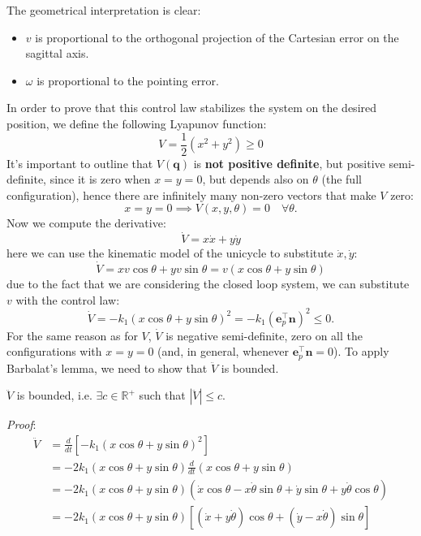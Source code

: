 \documentclass[10pt, a4paper]{report}
\newcommand{\q}{{\mathbf q}}
\begin{document}
\noindent The geometrical interpretation is clear:\begin{itemize}
    \item $v$ is proportional to the orthogonal projection of the Cartesian error on the sagittal axis.
    \item $\omega$ is proportional to the pointing error.
\end{itemize}
In order to prove that this control law stabilizes the system on the desired position, we define the following Lyapunov function:\begin{equation}
    V=\frac{1}{2}(x^2+y^2)\ge 0
\end{equation}
It's important to outline that $V(\q)$ is \textbf{not positive definite}, but positive semi-definite, since it is zero when $x=y=0$, but depends also on $\theta$ (the full configuration), hence there are infinitely many non-zero vectors that make $V$ zero:\begin{equation}
    x=y=0\implies V(x,y,\theta)=0 \quad \forall \theta.
\end{equation}
Now we compute the derivative:\begin{equation}
    \dot V = x\dot x+y\dot y 
\end{equation}
here we can use the kinematic model of the unicycle to substitute $\dot x,\dot y$:
\begin{equation}
    \dot V = xv\cos\theta+yv\sin\theta=v(x\cos\theta+y\sin\theta)
\end{equation}
due to the fact that we are considering the closed loop system, we can substitute $v$ with the control law:\begin{equation}
    \dot V = -k_1(x\cos\theta+y\sin\theta)^2=-k_1(\mathbf e_p^\top\mathbf n)^2\le 0.
\end{equation}
For the same reason as for $V$, $\dot V$ is negative semi-definite, zero on all the configurations with $x=y=0$ (and, in general, whenever $\mathbf e_p^\top\mathbf n=0$). To apply Barbalat's lemma, we need to show that $\ddot V$ is bounded.
\begin{boxproposition}{}{}
    $\ddot V$ is bounded, i.e. $\exists c\in\mathbb R^+$ such that $|\ddot V|\le c$.
\end{boxproposition}
\noindent\textit{Proof}:
\begin{align}
\ddot{V} &= \frac{d}{dt}\left[ -k_1 (x\cos\theta + y\sin\theta)^2 \right] \\
&= -2k_1 (x\cos\theta + y\sin\theta) \frac{d}{dt}(x\cos\theta + y\sin\theta) \\
&= -2k_1 (x\cos\theta + y\sin\theta) \left( \dot{x}\cos\theta - x\dot{\theta}\sin\theta + \dot{y}\sin\theta + y\dot{\theta}\cos\theta \right) \\
&= -2k_1 (x\cos\theta + y\sin\theta) \left[ (\dot{x} + y\dot{\theta})\cos\theta + (\dot{y} - x\dot{\theta})\sin\theta \right]
\end{align}
\end{document}
